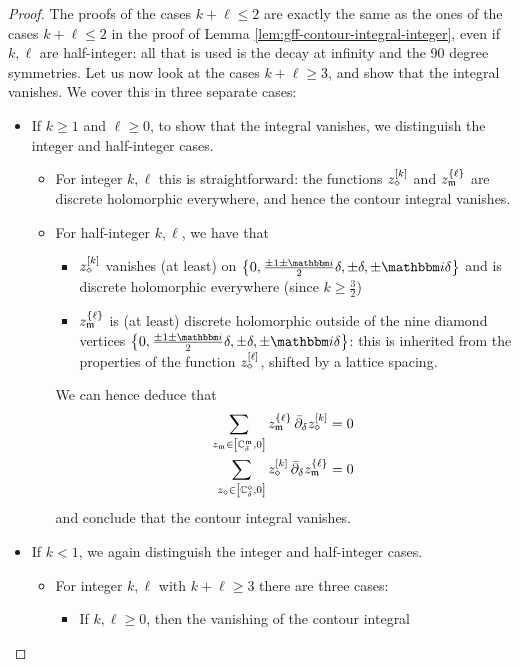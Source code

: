 \documentclass[12pt,oneside,english]{amsart}
\numberwithin{equation}{section}
\numberwithin{figure}{section}
\theoremstyle{plain}
\theoremstyle{plain}
\theoremstyle{plain}
\theoremstyle{plain}
\theoremstyle{remark}
\theoremstyle{definition}
\theoremstyle{plain}
\theoremstyle{plain}
\numberwithin{thm}{section}
\begin{document}
\begin{proof}
The proofs of the cases $k+\ell\leq2$ are exactly the same as the
ones of the cases $k+\ell\leq2$ in the proof of Lemma 
\ref{lem:gff-contour-integral-integer},
even if $k,\ell$ are half-integer: all that is used is the decay
at infinity and the 90 degree symmetries. Let us now look at the cases
$k+\ell\geq3$, and show that the integral vanishes. We cover this in 
three separate cases: 
\begin{itemize}
\item If $k\geq1$ and $\ell\geq0$, to show that the integral vanishes,
we distinguish the integer and half-integer cases. 
\begin{itemize}
\item For integer $k,\ell$ this is straightforward: the functions 
${z_{\diamond}^{[{k}]}}$
and ${z_{\mathfrak{m}}^{\{{\ell}\}}}$ are discrete holomorphic everywhere,
and hence the contour integral vanishes. 
\item For half-integer $k,\ell$, we have that 
\begin{itemize}
\item ${z_{\diamond}^{[{k}]}}$ vanishes (at least) on $\left\{ 
0,\frac{\pm1\pm \ii }{2}\meshsz,\pm\meshsz,\pm \ii \meshsz \right\} $
and is discrete holomorphic everywhere (since $k\geq\frac{3}{2}$) 
\item ${z_{\mathfrak{m}}^{\{{\ell}\}}}$ is (at least) discrete holomorphic
outside of the nine diamond vertices $\left\{ 0,\frac{\pm1\pm 
\ii}{2}\meshsz,\pm\meshsz,\pm \ii \meshsz \right\} $:
this is inherited from the properties of the function 
${z_{\diamond}^{[{\ell}]}}$,
shifted by a lattice spacing. 
\end{itemize}
We can hence deduce that 
\begin{align*}
\sum_{z_{\mathfrak{m}} \in {\left[ {\mathbb{C}_{{\delta}}^{\mathfrak{m}}}, 0 \right]}}
    {z_{\mathfrak{m}}^{\{{\ell}\}}} \,
    {{\bar{\partial}}}_{{\delta}} {z_{\diamond}^{[{k}]}}
& = 0 \\
\sum_{z_{\diamond}\in {\left[ {\mathbb{C}_{{\delta}}^{\diamond}}, 0 \right]}}
    {z_{\diamond}^{[{k}]}} \,
    {{\bar{\partial}}}_{{\delta}} {z_{\mathfrak{m}}^{\{{\ell}\}}}
& =0
\end{align*}
and conclude that the contour integral vanishes. 
\end{itemize}
\item If $k<1$, we again distinguish the integer and half-integer cases.
\begin{itemize}
\item For integer $k,\ell$ with $k+\ell \geq 3$ there are three cases:
\begin{itemize}
\item If $k,\ell \geq 0$, then the vanishing of the contour integral 

\end{itemize}
\end{itemize}
\end{itemize}
\end{proof}
\end{document}
